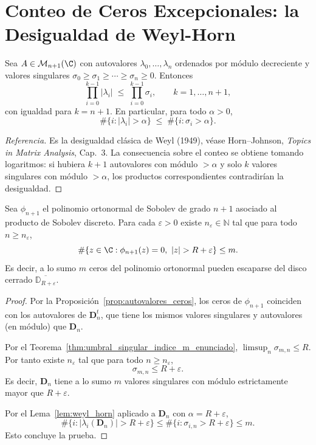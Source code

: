 
\section{Conteo de Ceros Excepcionales: la Desigualdad de Weyl-Horn}

\begin{lem}\label{lem:weyl_horn}
	Sea $A\in\mathcal M_{n+1}(\C)$ con autovalores $\lambda_0,\dots,\lambda_n$
	ordenados por módulo decreciente y valores singulares
	$\sigma_0\ge\sigma_1\ge\cdots\ge\sigma_n\ge 0$. Entonces
	\[
		\prod_{i=0}^{k-1}|\lambda_i|\;\le\;\prod_{i=0}^{k-1}\sigma_i,
		\qquad k=1,\dots,n+1,
	\]
	con igualdad para $k=n+1$. En particular, para todo $\alpha>0$,
	\[
		\#\{i:|\lambda_i|>\alpha\}\;\le\;\#\{i:\sigma_i>\alpha\}.
	\]
\end{lem}

\begin{proof}[Referencia]
	Es la desigualdad clásica de Weyl (1949), véase
	Horn--Johnson, \emph{Topics in Matrix Analysis}, Cap.~3.
	La consecuencia sobre el conteo se obtiene tomando logaritmos:
	si hubiera $k+1$ autovalores con módulo $>\alpha$ y solo $k$ valores
	singulares con módulo $>\alpha$, los productos correspondientes
	contradirían la desigualdad.
\end{proof}

\begin{thm}\label{thm:conteo_ceros}
	Sea $\phi_{n+1}$ el polinomio ortonormal de Sobolev de grado $n+1$
	asociado al producto de Sobolev discreto. Para cada $\varepsilon>0$ existe $n_\varepsilon\in\mathbb N$
	tal que para todo $n\ge n_\varepsilon$,
	\[
		\#\{z\in\C:\phi_{n+1}(z)=0,\ |z|>R+\varepsilon\}\le m.
	\]
	Es decir, a lo sumo $m$ ceros del polinomio ortonormal pueden escaparse del
	disco cerrado $\overline{\mathbb D_{R+\varepsilon}}$.
\end{thm}

\begin{proof}
	Por la Proposición~\ref{prop:autovalores_ceros}, los ceros de
	$\phi_{n+1}$ coinciden con los autovalores de $\mathbf D_n^t$, que tiene
	los mismos valores singulares y autovalores (en módulo) que $\mathbf D_n$.

	Por el Teorema~\ref{thm:umbral_singular_indice_m_enunciado}, $\limsup_n\sigma_{m,n}\le R$.
	Por tanto existe $n_\varepsilon$ tal que para todo $n\ge n_\varepsilon$,
	\[
		\sigma_{m,n}\le R+\varepsilon.
	\]
	Es decir, $\mathbf D_n$ tiene a lo sumo $m$ valores singulares con módulo
	estrictamente mayor que $R+\varepsilon$.

	Por el Lema~\ref{lem:weyl_horn} aplicado a $\mathbf D_n$ con $\alpha=R+\varepsilon$,
	\[
		\#\{i:|\lambda_i(\mathbf D_n)|>R+\varepsilon\}
		\le
		\#\{i:\sigma_{i,n}>R+\varepsilon\}\le m.
	\]
	Esto concluye la prueba.
\end{proof}

